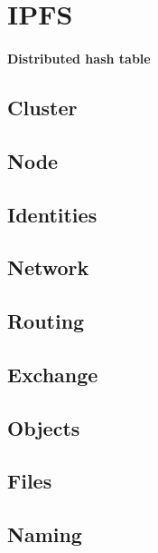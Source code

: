 \chapter{IPFS}

\subsubsection{Distributed hash table} 

\section{Cluster}

\section{Node}



\section{Identities}  
\section{Network}  
\section{Routing} 
\section{Exchange} 
\section{Objects}  
\section{Files}  
\section{Naming}  
